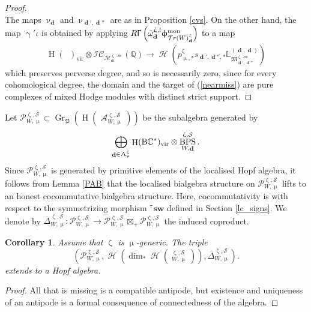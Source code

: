 \documentclass[a4paper,10pt]{amsart}
\renewcommand{\gamma}{\upgamma}
\renewcommand{\zeta}{\upzeta}
\renewcommand{\Lambda}{\Uplambda}
\renewcommand{\Gamma}{\Upgamma}
\renewcommand{\phi}{\upphi}
\renewcommand{\nu}{\upnu}
\renewcommand{\tau}{\uptau}
\renewcommand{\mu}{\upmu}
\newtheorem{corollary}[theorem]{Corollary}
\DeclareMathOperator{\BC}{B\mathbb{C}^*}
\DeclareMathOperator{\Pf}{\mathfrak{P}}
\newcommand{\LL}{\mathbb{L}}
\newcommand{\QQ}{\mathbb{Q}}
\newcommand{\SP}{\mathcal{S}}
\newcommand{\WW}{\mathcal{T}r(W)}
\newcommand{\Mst}{\mathfrak{M}}
\newcommand{\Msp}{\mathcal{M}}
\newcommand{\ICS}{\mathcal{IC}}
\newcommand{\phim}[1]{\phi^{\mon}_{#1}}
\DeclareMathOperator{\sst}{-ss}
\DeclareMathOperator{\mon}{mon}
\DeclareMathOperator{\Gr}{Gr}
\DeclareMathOperator{\ms}{\tilde{\ast}}
\DeclareMathOperator{\dd}{\mathbf{d}}
\DeclareMathOperator{\DT}{BPS}
\DeclareMathOperator{\vir}{vir}
\DeclareMathOperator{\Ho}{\mathcal{H}}
\DeclareMathOperator{\HO}{H}
\DeclareMathOperator{\Coha}{\mathcal{A}}
\begin{document}
\begin{proof}
\[\]
The maps $\nu_{\dd}$ and $\nu_{\dd',\dd''}$ are as in Proposition \ref{cvs}.  On the other hand, the map $\gamma'\iota$ is obtained by applying $R\Gamma\left(\tilde{\omega}^{\zeta,!}_{\dd}\phim{\WW_{\dd}^{\zeta}}\right)$ to a map
\begin{align}
\label{nearmiss}
\HO(\BC )_{\vir}\otimes\ICS_{\Msp^{\zeta\sst}_{\dd}}(\QQ)\rightarrow \Ho\left(p^{\zeta}_{\mu,*}s_{\dd',\dd'',*}\LL^{(\dd,\dd)}_{\Mst^{\zeta\sst}_{\dd',\dd''}}\right)
\end{align}
which preserves perverse degree, and so is necessarily zero, since for every cohomological degree, the domain and the target of (\ref{nearmiss}) are pure complexes of mixed Hodge modules with distinct strict support.
\end{proof}
Let $\mathcal{P}^{\zeta,\SP}_{W,\mu}\subset \Gr_{\Pf}(\HO(\Coha^{\zeta,\SP}_{W,\mu}))$ be the subalgebra generated by 
\[ 
\bigoplus_{\dd\in\Lambda_{\mu}^{\zeta}}\HO(\BC )_{\vir}\otimes\DT_{W,\dd}^{\zeta,\SP}.  
\]
Since $\mathcal{P}^{\zeta,\SP}_{W,\mu}$ is generated by primitive elements of the localised Hopf algebra, it follows from Lemma \ref{PAB} that the localised bialgebra structure on $\mathcal{P}^{\zeta,\SP}_{W,\mu}$ lifts to an honest cocommutative bialgebra structure.  Here, cocommutativity is with respect to the symmetrizing morphism ${}^{\tau}\mathbf{sw}$ defined in Section \ref{lc_signs}.  We denote by $\overline{\Delta}_{W,\mu}^{\zeta,\SP}\colon \mathcal{P}^{\zeta,\SP}_{W,\mu}\rightarrow \mathcal{P}^{\zeta,\SP}_{W,\mu}\boxtimes_+ \mathcal{P}^{\zeta,\SP}_{W,\mu}$ the induced coproduct.
\begin{corollary}
\label{trueHopf}
Assume that $\zeta$ is $\mu$-generic.  The triple 
\[
\left(\mathcal{P}_{W,\mu}^{\zeta,\SP},\Ho\left(\dim_*\Ho(\ms_{W,\mu}^{\zeta,\SP})\right), \overline{\Delta}^{\zeta,\SP}_{W,\mu}\right).
\]
extends to a Hopf algebra.
\end{corollary}
\begin{proof}
All that is missing is a compatible antipode, but existence and uniqueness of an antipode is a formal consequence of connectedness of the algebra.
\end{proof}
\end{document}
